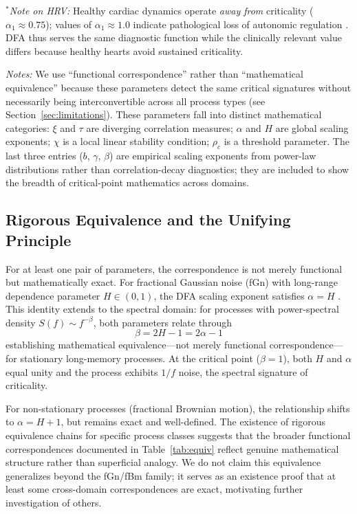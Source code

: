 \documentclass[11pt]{article}
\begin{document}
\noindent$^*$\textit{Note on HRV:} Healthy cardiac dynamics operate \textit{away from} criticality ($\alpha_1 \approx 0.75$); values of $\alpha_1 \approx 1.0$ indicate pathological loss of autonomic regulation \citep{peng1995}. DFA thus serves the same diagnostic function while the clinically relevant value differs because healthy hearts avoid sustained criticality.

\noindent\textit{Notes:} We use ``functional correspondence'' rather than ``mathematical equivalence'' because these parameters detect the same critical signatures without necessarily being interconvertible across all process types (see Section~\ref{sec:limitations}). These parameters fall into distinct mathematical categories: $\xi$ and $\tau$ are diverging correlation measures; $\alpha$ and $H$ are global scaling exponents; $\chi$ is a local linear stability condition; $\rho_c$ is a threshold parameter. The last three entries ($b$, $\gamma$, $\beta$) are empirical scaling exponents from power-law distributions rather than correlation-decay diagnostics; they are included to show the breadth of critical-point mathematics across domains.

\subsection{Rigorous Equivalence and the Unifying Principle}
\label{sec:equiv_chain}

For at least one pair of parameters, the correspondence is not merely functional but mathematically exact. For fractional Gaussian noise (fGn) with long-range dependence parameter $H \in (0,1)$, the DFA scaling exponent satisfies $\alpha = H$ \citep{kantelhardt2002}. This identity extends to the spectral domain: for processes with power-spectral density $S(f) \sim f^{-\beta}$, both parameters relate through
\begin{equation}
\beta = 2H - 1 = 2\alpha - 1
\label{eq:spectral}
\end{equation}
establishing mathematical equivalence---not merely functional correspondence---for stationary long-memory processes. At the critical point ($\beta = 1$), both $H$ and $\alpha$ equal unity and the process exhibits $1/f$ noise, the spectral signature of criticality.

For non-stationary processes (fractional Brownian motion), the relationship shifts to $\alpha = H + 1$, but remains exact and well-defined. The existence of rigorous equivalence chains for specific process classes suggests that the broader functional correspondences documented in Table~\ref{tab:equiv} reflect genuine mathematical structure rather than superficial analogy. We do not claim this equivalence generalizes beyond the fGn/fBm family; it serves as an existence proof that at least some cross-domain correspondences are exact, motivating further investigation of others.
\end{document}
